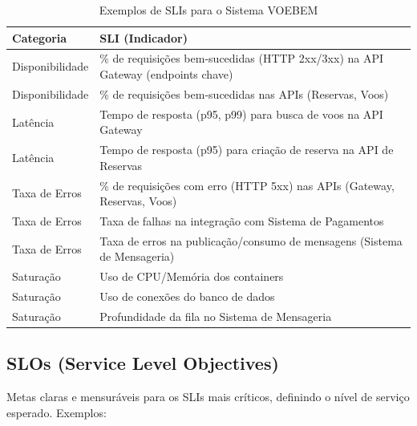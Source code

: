 \begin{table}[htbp]
    \centering
    \caption{Exemplos de SLIs para o Sistema VOEBEM}
    \label{tab:slis}
    \begin{tabularx}{\textwidth}{lX} %
        \toprule %
        \textbf{Categoria} & \textbf{SLI (Indicador)} \\
        \midrule %
        Disponibilidade & \% de requisições bem-sucedidas (HTTP 2xx/3xx) na API Gateway (endpoints chave) \\
        Disponibilidade & \% de requisições bem-sucedidas nas APIs (Reservas, Voos) \\
        Latência & Tempo de resposta (p95, p99) para busca de voos na API Gateway \\
        Latência & Tempo de resposta (p95) para criação de reserva na API de Reservas \\
        Taxa de Erros & \% de requisições com erro (HTTP 5xx) nas APIs (Gateway, Reservas, Voos) \\
        Taxa de Erros & Taxa de falhas na integração com Sistema de Pagamentos \\
        Taxa de Erros & Taxa de erros na publicação/consumo de mensagens (Sistema de Mensageria) \\
        Saturação & Uso de CPU/Memória dos containers \\
        Saturação & Uso de conexões do banco de dados \\
        Saturação & Profundidade da fila no Sistema de Mensageria \\
        \bottomrule %
    \end{tabularx}
\end{table}

\subsection{SLOs (Service Level Objectives)}
\label{subsec:slos}
Metas claras e mensuráveis para os SLIs mais críticos, definindo o nível de serviço esperado. Exemplos:

